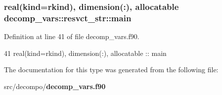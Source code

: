 \subsubsection[{main}]{\setlength{\rightskip}{0pt plus 5cm}real(kind=rkind), dimension(\+:), allocatable decomp\+\_\+vars\+::resvct\+\_\+str\+::main\hspace{0.3cm}{\ttfamily [private]}}\label{structdecomp__vars_1_1resvct__str_a4d2fee54f4a696f343eb65f51a2d8f4c}


Definition at line 41 of file decomp\+\_\+vars.\+f90.


\begin{DoxyCode}
41     \textcolor{keywordtype}{real(kind=rkind)}, \textcolor{keywordtype}{dimension(:)}, \textcolor{keywordtype}{allocatable} :: main
\end{DoxyCode}


The documentation for this type was generated from the following file\+:\begin{DoxyCompactItemize}
\item 
src/decompo/{\bf decomp\+\_\+vars.\+f90}\end{DoxyCompactItemize}
